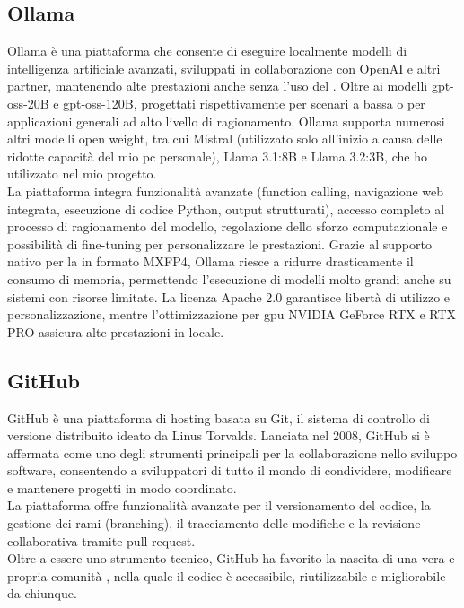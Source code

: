 \subsection{Ollama}
\noindent Ollama è una piattaforma che consente di eseguire localmente modelli di intelligenza artificiale avanzati, sviluppati in collaborazione con OpenAI e altri partner, mantenendo alte prestazioni anche senza l’uso del . 
Oltre ai modelli gpt-oss-20B e gpt-oss-120B, progettati rispettivamente per scenari a bassa  o per applicazioni generali ad alto livello di ragionamento, Ollama supporta numerosi altri modelli open weight, tra cui Mistral (utilizzato solo all’inizio a causa delle ridotte capacità del mio pc personale), Llama 3.1:8B e Llama 3.2:3B, che ho utilizzato nel mio progetto.\\ 
La piattaforma integra funzionalità avanzate (function calling, navigazione web integrata, esecuzione di codice Python, output strutturati), accesso completo al processo di ragionamento del modello, regolazione dello sforzo computazionale e possibilità di fine-tuning per personalizzare le prestazioni. 
Grazie al supporto nativo per la  in formato MXFP4, Ollama riesce a ridurre drasticamente il consumo di memoria, permettendo l’esecuzione di modelli molto grandi anche su sistemi con risorse limitate. 
La licenza Apache 2.0 garantisce libertà di utilizzo e personalizzazione, mentre l’ottimizzazione per \acrshort{gpu} NVIDIA GeForce RTX e RTX PRO assicura alte prestazioni in locale.


\subsection{GitHub}
\noindent GitHub è una piattaforma di hosting basata su Git, il sistema di controllo di versione distribuito ideato da Linus Torvalds. Lanciata nel 2008, GitHub si è affermata come uno degli strumenti principali per la collaborazione nello sviluppo software, consentendo a sviluppatori di tutto il mondo di condividere, modificare e mantenere progetti in modo coordinato. \\La piattaforma offre funzionalità avanzate per il versionamento del codice, la gestione dei rami (branching), il tracciamento delle modifiche e la revisione collaborativa tramite pull request. \\Oltre a essere uno strumento tecnico, GitHub ha favorito la nascita di una vera e propria comunità , nella quale il codice è accessibile, riutilizzabile e migliorabile da chiunque.

